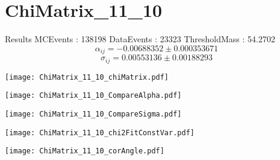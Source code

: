 \documentclass[a4paper,12pt]{article}
\begin{document}
\section{ChiMatrix\_11\_10}
\begin{minipage}{0.49\linewidth} Results \newline
MCEvents : 138198\newline
DataEvents : 23323 \newline
ThresholdMass : 54.2702\\
$$\alpha_{ij} = -0.00688352\pm 0.000353671$$
$$\sigma_{ij} = 0.00553136\pm 0.00188293$$
\end{minipage}\hfill
\begin{minipage}{0.49\linewidth} 
\texttt{[image: ChiMatrix\_11\_10\_chiMatrix.pdf]}\\
\end{minipage}
\hfill
\begin{minipage}{0.49\linewidth} 
\texttt{[image: ChiMatrix\_11\_10\_CompareAlpha.pdf]}\\
\end{minipage}
\hfill
\begin{minipage}{0.49\linewidth} 
\texttt{[image: ChiMatrix\_11\_10\_CompareSigma.pdf]}\\
\end{minipage}
\begin{minipage}{0.49\linewidth} 
\texttt{[image: ChiMatrix\_11\_10\_chi2FitConstVar.pdf]}\\
\end{minipage}
\hfill
\begin{minipage}{0.49\linewidth} 
\texttt{[image: ChiMatrix\_11\_10\_corAngle.pdf]}\\
\end{minipage}
\end{document}
